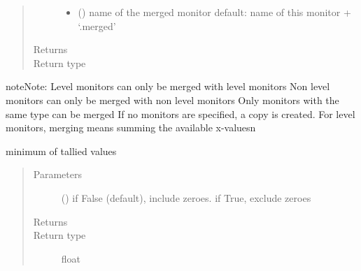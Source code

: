 \documentclass[letterpaper,10pt,english]{sphinxmanual}
\begin{document}
\begin{fulllineitems}
\begin{fulllineitems}
\begin{quote}
\begin{description}
\begin{itemize}
\item {} 
 () \textendash{} name of the merged monitor 
default: name of this monitor + ‘.merged’

\end{itemize}

\item[{Returns}] \leavevmode
{}

\item[{Return type}] \leavevmode
{\hyperref[\detokenize{Reference:salabim.Monitor}]{}}

\end{description}\end{quote}

\begin{sphinxadmonition}{note}{Note:}
Level monitors can only be merged with level monitors 
Non level monitors can only be merged with non level monitors 
Only monitors with the same type can be merged 
If no monitors are specified, a copy is created. 
For level monitors, merging means summing the available x-values\textbar{}n\textbar{}
\end{sphinxadmonition}

\end{fulllineitems}


\begin{fulllineitems}
\label{\detokenize{Reference:salabim.Monitor.minimum}}
minimum of tallied values
\begin{quote}\begin{description}
\item[{Parameters}] \leavevmode
{} () \textendash{} if False (default), include zeroes. if True, exclude zeroes

\item[{Returns}] \leavevmode
{}

\item[{Return type}] \leavevmode
float

\end{description}\end{quote}

\end{fulllineitems}


\end{fulllineitems}
\end{document}
